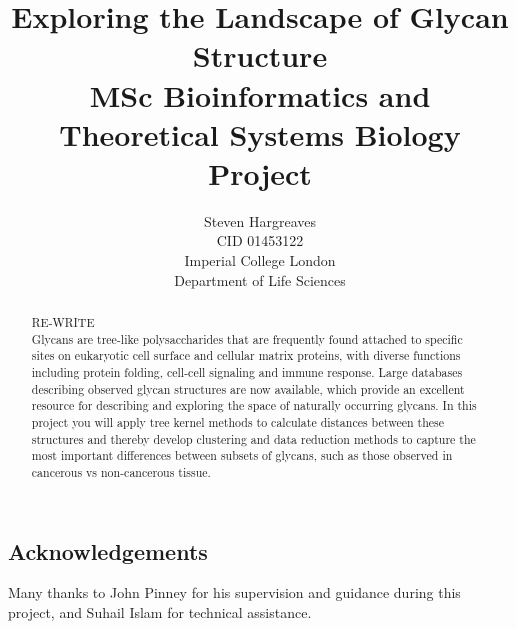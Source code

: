 \documentclass[12pt,a4paper]{article}
\begin{document}
{\selectfont}
\title{\Huge Exploring the Landscape of Glycan Structure\vspace{1cm}\\ \large  MSc Bioinformatics and Theoretical Systems Biology Project\vspace{11cm}}
\date{}

\author{\Large Steven Hargreaves\\
\normalsize CID 01453122 \\\vspace{0.5cm}
\normalsize Imperial College London \\
\normalsize Department of Life Sciences}


\maketitle
\newpage
\begin{abstract}
\doublespacing
\noindent
RE-WRITE\\
Glycans are tree-like polysaccharides that are frequently found attached to specific sites on eukaryotic cell surface and cellular matrix proteins, with diverse functions including protein folding, cell-cell signaling and immune response. Large databases describing observed glycan structures are now available, which provide an excellent resource for describing and exploring the space of naturally occurring glycans. In this project you will apply tree kernel methods to calculate distances between these structures and thereby develop clustering and data reduction methods to capture the most important differences between subsets of glycans, such as those observed in cancerous vs non-cancerous tissue.
\end{abstract}

\newpage
\begin{center}
\section*{Acknowledgements}
\doublespacing
Many thanks to John Pinney for his supervision and guidance during this project, and Suhail Islam for technical assistance.
\end{center}
\newpage
\tableofcontents
\newpage
\end{document}
